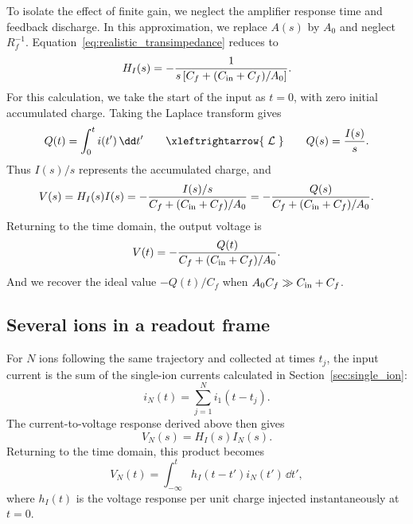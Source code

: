 To isolate the effect of finite gain, we neglect the amplifier response time and feedback discharge. In this approximation, we replace $A(s)$ by $A_0$ and neglect $R_f^{-1}$.  Equation~\eqref{eq:realistic_transimpedance} reduces to
%
\begin{equation}
 H_I(s)=-\frac{1}{s\left[C_f+(C_{\rm in}+C_f)/A_0\right]}.
 \label{eq:realistic_integrating_limit}
\end{equation}
%
For this calculation, we take the start of the input as $t=0$, with zero initial accumulated charge. Taking the Laplace transform gives
%
\begin{equation}
 Q(t)=\int_0^t i(t')\,\dd t'
 \qquad\xleftrightarrow{\;\mathcal{L}\;}\qquad
 Q(s)=\frac{I(s)}{s}.
 \label{eq:realistic_charge_transform}
\end{equation}
%
Thus $I(s)/s$ represents the accumulated charge, and
%
\begin{equation}
 V(s)=H_I(s)I(s)
 =-\frac{I(s)/s}{C_f+(C_{\rm in}+C_f)/A_0}
 =-\frac{Q(s)}{C_f+(C_{\rm in}+C_f)/A_0}.
 \label{eq:realistic_voltage_transform}
\end{equation}
%
Returning to the time domain, the output voltage is
\begin{equation}
 V(t)=-\frac{Q(t)}{C_f+(C_{\rm in}+C_f)/A_0}.
 \label{eq:realistic_charge_gain}
\end{equation}
%
And we recover the ideal value $-Q(t)/C_f$ when  $A_0C_f\gg C_{\rm in}+C_f$.

\subsection{Several ions in a readout frame}

For $N$ ions following the same trajectory and collected at times $t_j$, the input current is the sum of the single-ion currents calculated in Section~\ref{sec:single_ion}:
%
\begin{equation}
 i_N(t)=\sum_{j=1}^{N}i_1(t-t_j).
 \label{eq:realistic_packet_current}
\end{equation}
%
The current-to-voltage response derived above then gives
%
\begin{equation}
 V_N(s)=H_I(s)I_N(s).
 \label{eq:realistic_packet_transform}
\end{equation}
%
Returning to the time domain, this product becomes
%
\begin{equation}
 V_N(t)=\int_{-\infty}^{t}h_I(t-t')i_N(t')\,\dd t',
 \label{eq:realistic_packet}
\end{equation}
%
where $h_I(t)$ is the voltage response per unit charge injected instantaneously at $t=0$.

